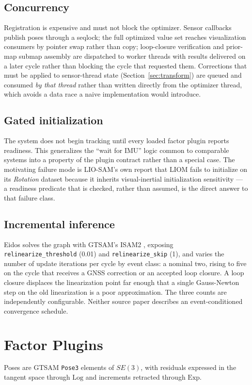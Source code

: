 \documentclass[conference]{IEEEtran}
\begin{document}
\subsection{Concurrency}
Registration is expensive and must not block the optimizer. Sensor callbacks publish poses through a seqlock; the full optimized value set reaches visualization consumers by pointer swap rather than copy; loop-closure verification and prior-map submap assembly are dispatched to worker threads with results delivered on a later cycle rather than blocking the cycle that requested them. Corrections that must be applied to sensor-thread state (Section~\ref{sec:transform}) are queued and consumed \emph{by that thread} rather than written directly from the optimizer thread, which avoids a data race a naive implementation would introduce.

\subsection{Gated initialization}
The system does not begin tracking until every loaded factor plugin reports readiness. This generalizes the ``wait for IMU'' logic common to comparable systems into a property of the plugin contract rather than a special case. The motivating failure mode is LIO-SAM's own report that LIOM fails to initialize on its \emph{Rotation} dataset because it inherits visual-inertial initialization sensitivity \parencite{shan2020liosam} --- a readiness predicate that is checked, rather than assumed, is the direct answer to that failure class.

\subsection{Incremental inference}
Eidos solves the graph with GTSAM's ISAM2 \parencite{kaess2012isam2}, exposing \texttt{relinearize\_threshold} (0.01) and \texttt{relinearize\_skip} (1), and varies the number of update iterations per cycle by event class: a nominal two, rising to five on the cycle that receives a GNSS correction or an accepted loop closure. A loop closure displaces the linearization point far enough that a single Gauss-Newton step on the old linearization is a poor approximation. The three counts are independently configurable. Neither source paper describes an event-conditioned convergence schedule.

\section{Factor Plugins}
\label{sec:factors}
Poses are GTSAM \texttt{Pose3} elements of $SE(3)$, with residuals expressed in the tangent space through $\mathrm{Log}$ and increments retracted through $\mathrm{Exp}$.
\end{document}
